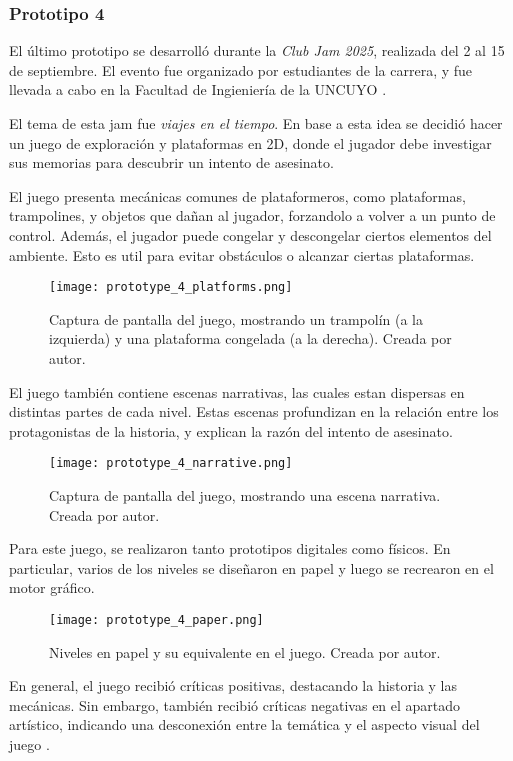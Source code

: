 \subsubsection{Prototipo 4}
El último prototipo se desarrolló durante la \textit{Club Jam 2025}, realizada del 2 al 15 de septiembre. El evento fue organizado por estudiantes de la carrera, y fue llevada a cabo en la Facultad de Ingieniería de la UNCUYO \cite{ClubJam2025}.
\par El tema de esta jam fue \textit{viajes en el tiempo}. En base a esta idea se decidió hacer un juego de exploración y plataformas en 2D, donde el jugador debe investigar sus memorias para descubrir un intento de asesinato.
\par El juego presenta mecánicas comunes de plataformeros, como plataformas, trampolines, y objetos que dañan al jugador, forzandolo a volver a un punto de control. Además, el jugador puede congelar y descongelar ciertos elementos del ambiente. Esto es util para evitar obstáculos o alcanzar ciertas plataformas.
\begin{figure}[H]
  \centering
  \texttt{[image: prototype\_4\_platforms.png]}
  \caption{Captura de pantalla del juego, mostrando un trampolín (a la izquierda) y una plataforma congelada (a la derecha). Creada por autor.}
  \label{fig:x prototipo 4 plataformas}
\end{figure}
\par El juego también contiene escenas narrativas, las cuales estan dispersas en distintas partes de cada nivel. Estas escenas profundizan en la relación entre los protagonistas de la historia, y explican la razón del intento de asesinato.
\begin{figure}[H]
  \centering
  \texttt{[image: prototype\_4\_narrative.png]}
  \caption{Captura de pantalla del juego, mostrando una escena narrativa. Creada por autor.}
  \label{fig:x prototipo 4 narrativa}
\end{figure}
\par Para este juego, se realizaron tanto prototipos digitales como físicos. En particular, varios de los niveles se diseñaron en papel y luego se recrearon en el motor gráfico.
\begin{figure}[H]
  \centering
  \texttt{[image: prototype\_4\_paper.png]}
  \caption{Niveles en papel y su equivalente en el juego. Creada por autor.}
  \label{fig:x prototipo 4 prototipo fisico}
\end{figure}
\bigbreak
\par En general, el juego recibió críticas positivas, destacando la historia y las mecánicas. Sin embargo, también recibió críticas negativas en el apartado artístico, indicando una desconexión entre la temática y el aspecto visual del juego \cite{VueloKaleidoskopioFranco}.
